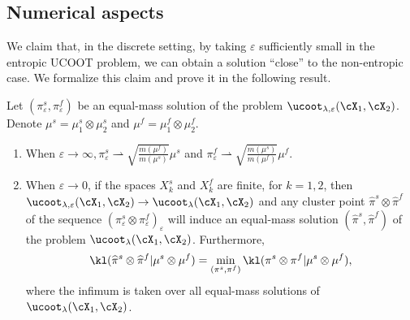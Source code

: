 \subsection{Numerical aspects}
We claim that, in the discrete setting, by taking $\varepsilon$ sufficiently small in the entropic UCOOT problem, we can obtain a solution ``close'' to the non-entropic case. We formalize this claim and prove it in the following result.
\begin{claim}
  \label{convergence_minimiser_unbalanced}
  Let $(\pi_{\varepsilon}^s, \pi_{\varepsilon}^f)$ be an equal-mass solution of the problem
  $\ucoot_{\lambda, \varepsilon}(\cX_1, \cX_2)$. Denote $\mu^s = \mu_1^s \otimes \mu_2^s$ and $\mu^f = \mu_1^f \otimes \mu_2^f$.
  \begin{enumerate}
    \item When $\varepsilon \to \infty, \pi_{\varepsilon}^s \rightharpoonup \sqrt{\frac{m(\mu^f)}{m(\mu^s)}} \mu^s$
    and $\pi_{\varepsilon}^f  \rightharpoonup \sqrt{\frac{m(\mu^s)}{m(\mu^f)}} \mu^f$.

    \item When $\varepsilon \to 0$, if the spaces $X_k^s$ and $X_k^f$ are finite,
    for $k=1,2$, then $\ucoot_{\lambda, \varepsilon}(\cX_1, \cX_2) \to \ucoot_{\lambda}(\cX_1, \cX_2)$ and
    any cluster point $\widehat{\pi}^s \otimes \widehat{\pi}^f$ of the sequence
    $(\pi_{\varepsilon}^s \otimes \pi_{\varepsilon}^f)_{\varepsilon}$ will induce an equal-mass
    solution $(\widehat{\pi}^s, \widehat{\pi}^f)$ of the problem
    $\ucoot_{\lambda}(\cX_1, \cX_2)$. Furthermore,
    \begin{equation*}
      \kl(\widehat{\pi}^s \otimes \widehat{\pi}^f | \mu^s \otimes \mu^f) =
      \min_{(\pi^s, \pi^f)} \kl(\pi^s \otimes \pi^f \vert \mu^s \otimes \mu^f),
    \end{equation*}
    where the infimum is taken over all equal-mass solutions of $\ucoot_{\lambda}(\cX_1, \cX_2)$.
  \end{enumerate}
\end{claim}
